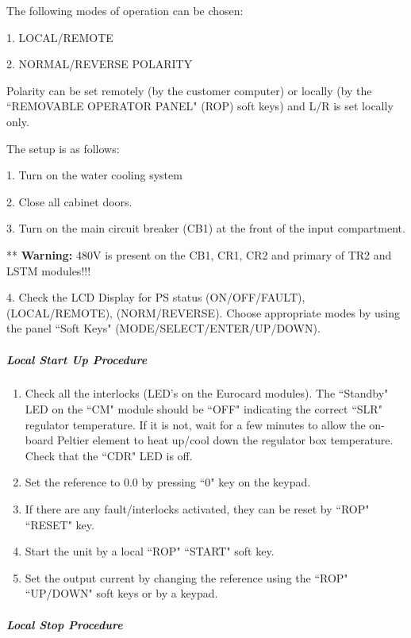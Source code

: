 The following modes of operation can be chosen:

\begin{description}
\item{1.} LOCAL/REMOTE
\item{2.} NORMAL/REVERSE POLARITY
\end{description}

Polarity can be set remotely (by the customer computer) or locally
(by the ``REMOVABLE OPERATOR PANEL" (ROP) soft keys) and L/R is set
locally only.

The setup is as follows:

\begin{description}
\item{1.} Turn on the water cooling system
\item{2.} Close all cabinet doors.
\item{3.} Turn on the main circuit breaker (CB1) at the front of the
input compartment.
\item{**} {\bf Warning:} 480V is present on the CB1, CR1, CR2 and primary of
TR2 and LSTM modules!!!
\item{4.} Check the LCD Display for PS status (ON/OFF/FAULT),
(LOCAL/REMOTE), (NORM/REVERSE). Choose appropriate modes by using the 
panel
``Soft Keys" (MODE/SELECT/ENTER/UP/DOWN).
\end{description}

\subparagraph{Local Start Up Procedure}

\begin{enumerate}
\item Check all the interlocks (LED's on the Eurocard modules).  The
``Standby" LED on the ``CM" module should be ``OFF" indicating the correct
``SLR" regulator temperature.  If it is not, wait for a few minutes to
allow the on-board Peltier element to heat up/cool down the regulator
box temperature.  Check that the ``CDR" LED is off.
\item Set the reference to 0.0 by pressing ``0" key on the keypad.
\item If there are any fault/interlocks activated, they can be reset by
``ROP" ``RESET" key.
\item Start the unit by a local ``ROP" ``START" soft key.
\item Set the output current by changing the reference using the
``ROP" ``UP/DOWN" soft keys or by a keypad.
\end{enumerate}

\subparagraph{Local Stop Procedure}

